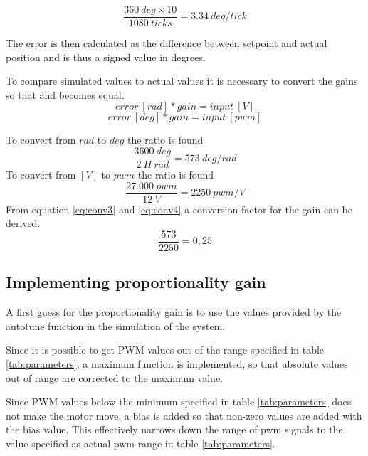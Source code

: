 \begin{equation}
\frac{360 \ deg \times 10}{1080 \ ticks} = 3.34\ deg/tick 
\end{equation}

The error is then calculated as the difference between setpoint and actual position and is thus a signed value in degrees.

To compare simulated values to actual values it is necessary to convert the gains so that \label{eq:conv1} and \label{eq:conv2} becomes equal. 
\begin{equation}
error \ [rad] * gain = input \ [V]
\label{eq:conv1}
\end{equation}
\begin{equation}
error \ [deg] * gain = input \ [pwm]
\label{eq:conv2}
\end{equation}

To convert from $rad$ to $deg$ the ratio is found
\begin{equation}
\frac{3600 \ deg}{2 \ \Pi \ rad} = 573 \ deg/rad
\label{eq:conv3}
\end{equation}
To convert from $[V]$ to $pwm$ the ratio is found
\begin{equation}
\frac{27.000 \ pwm}{12 \ V} = 2250 \ pwm/V
\label{eq:conv4}
\end{equation}
From equation \ref{eq:conv3} and \ref{eq:conv4} a conversion factor for the gain can be derived.
\begin{equation}
\frac{573}{2250} = 0,25
\label{eq:conv}
\end{equation}

\subsection{Implementing proportionality gain}
A first guess for the proportionality gain is to use the values provided by the autotune function in the simulation of the system. 

Since it is possible to get PWM values out of the range specified in table \ref{tab:parameters}, a maximum function is implemented, so that absolute values out of range are corrected to the maximum value.

Since PWM values below the minimum specified in table \ref{tab:parameters} does not make the motor move, a bias is added so that non-zero values are added with the bias value. This effectively narrows down the range of pwm signals to the value specified as actual pwm range in table \ref{tab:parameters}. 

